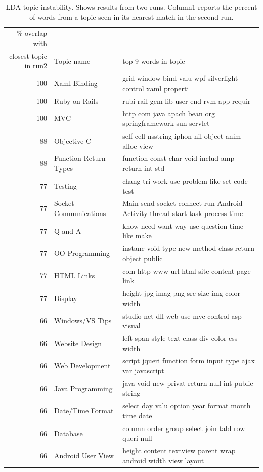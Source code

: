 \documentclass[twocolumn,5p,sort&compress]{elsarticle}
\theoremstyle{break}
\begin{document}
\begin{table}[!t]
\renewcommand{\baselinestretch}{0.75}
\begin{center}
\footnotesize
\caption{LDA topic instability. Shows results from two runs. Column1 reports the percent
of words from a topic seen in its nearest match in the second run.}
\label{tbl:olap}
\begin{tabular}{r|l|l}
\% overlap with & &\\
closest topic in run2  & Topic name & top 9 words in topic\\\hline
100 &Xaml Binding & grid window bind valu wpf silverlight control xaml properti\\
100 & Ruby on Rails & rubi rail gem lib user end rvm app requir  \\ 
100 &MVC & http com java apach bean org springframework sun servlet\\
88 &Objective C & self cell nsstring iphon nil object anim alloc view\\
88 &Function Return Types & function const char void includ amp return int std\\
77 &Testing & chang tri work use problem like set code test\\
77 &Socket Communications & Main send socket connect run Android Activity thread start task process time\\
77 &Q and A & know need want way use question time like make\\
77 &OO Programming & instanc void type new method class return object public\\
77 &HTML Links & com http www url html site content page link\\
77 &Display & height jpg imag png src size img color width\\
66 &Windows/VS Tips & studio net dll web use mvc control asp visual\\
66 &Website Design & left span style text class div color css width\\
66 &Web Development & script jqueri function form input type ajax var javascript\\
66 &Java Programming & java void new privat return null int public string\\
66 &Date/Time Format & select day valu option year format month time date\\
66 &Database & column order group select join tabl row queri null\\
66 &Android User View & height content textview parent wrap android width view layout\\

\end{tabular}
\end{center}
\end{table}
\end{document}
